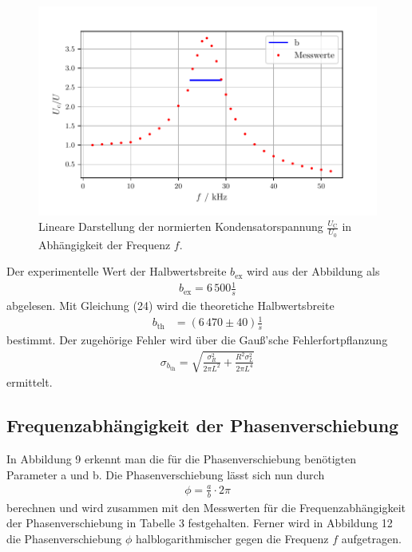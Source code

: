 \begin{figure}[H]
  \centering
  \includegraphics{plotc.pdf}
  \caption{Lineare Darstellung der normierten Kondensatorspannung $\frac{U_\text{C}}{U_\text{0}}$ in Abhängigkeit der Frequenz $f$.}
  \label{fig:Plot c}
\end{figure}

Der experimentelle Wert der Halbwertsbreite $b_\text{ex}$ wird aus der Abbildung als
\begin{align*}
b_\text{ex} = 6\,500\frac{1}{s}
\end{align*}
abgelesen. Mit Gleichung (24) wird die theoretiche Halbwertsbreite 
\begin{align*}
b_\text{th} &= (6\,470 \pm 40)\frac{1}{s}
\end{align*}
bestimmt. Der zugehörige Fehler wird über die Gauß'sche Fehlerfortpflanzung 
\begin{align*}
\sigma_{b_\text{th}} = \sqrt{\frac{\sigma_{R}^{2}}{2 \pi L^{2}} + \frac{R^{2} \sigma_{L}^{2}}{2 \pi L^{4}}}
\end{align*}
ermittelt.


\subsection{Frequenzabhängigkeit der Phasenverschiebung}
In Abbildung 9 erkennt man die für die Phasenverschiebung benötigten Parameter a und b. Die Phasenverschiebung lässt sich nun durch
\begin{align*}
\phi = \frac{a}{b} \cdot 2\pi
\end{align*}
berechnen und wird zusammen mit den Messwerten für die Frequenzabhängigkeit der Phasenverschiebung in Tabelle 3 festgehalten.
Ferner wird in Abbildung 12 die Phasenverschiebung $\phi$ halblogarithmischer gegen die Frequenz $f$ aufgetragen.


